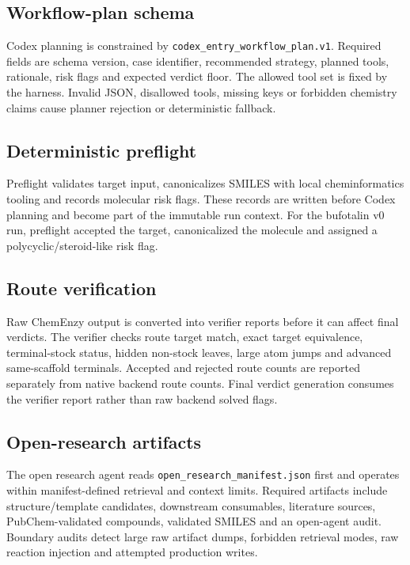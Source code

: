 \documentclass[11pt]{article}
\begin{document}
\subsection*{Workflow-plan schema}

Codex planning is constrained by \texttt{codex\_entry\_workflow\_plan.v1}. Required fields are schema version, case identifier, recommended strategy, planned tools, rationale, risk flags and expected verdict floor. The allowed tool set is fixed by the harness. Invalid JSON, disallowed tools, missing keys or forbidden chemistry claims cause planner rejection or deterministic fallback.

\subsection*{Deterministic preflight}

Preflight validates target input, canonicalizes SMILES with local cheminformatics tooling and records molecular risk flags. These records are written before Codex planning and become part of the immutable run context. For the bufotalin v0 run, preflight accepted the target, canonicalized the molecule and assigned a polycyclic/steroid-like risk flag.

\subsection*{Route verification}

Raw ChemEnzy output is converted into verifier reports before it can affect final verdicts. The verifier checks route target match, exact target equivalence, terminal-stock status, hidden non-stock leaves, large atom jumps and advanced same-scaffold terminals. Accepted and rejected route counts are reported separately from native backend route counts. Final verdict generation consumes the verifier report rather than raw backend solved flags.

\subsection*{Open-research artifacts}

The open research agent reads \texttt{open\_research\_manifest.json} first and operates within manifest-defined retrieval and context limits. Required artifacts include structure/template candidates, downstream consumables, literature sources, PubChem-validated compounds, validated SMILES and an open-agent audit. Boundary audits detect large raw artifact dumps, forbidden retrieval modes, raw reaction injection and attempted production writes.
\end{document}
